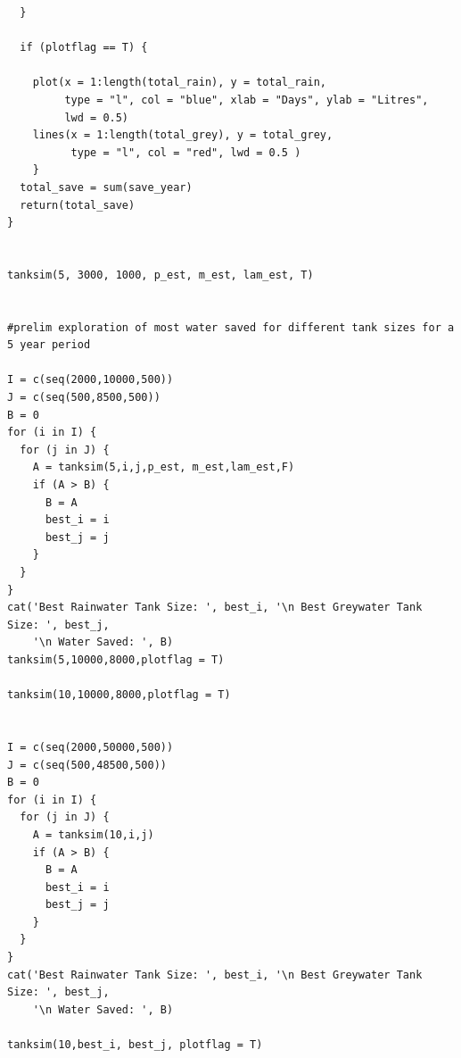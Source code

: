 \documentclass[a4paper, 11pt, oneside]{article}
\begin{document}
\begin{verbatim}
  }
  
  if (plotflag == T) {

    plot(x = 1:length(total_rain), y = total_rain,
         type = "l", col = "blue", xlab = "Days", ylab = "Litres",
         lwd = 0.5)
    lines(x = 1:length(total_grey), y = total_grey,
          type = "l", col = "red", lwd = 0.5 )
    }
  total_save = sum(save_year)
  return(total_save)
}


tanksim(5, 3000, 1000, p_est, m_est, lam_est, T)


#prelim exploration of most water saved for different tank sizes for a 5 year period

I = c(seq(2000,10000,500))
J = c(seq(500,8500,500))
B = 0
for (i in I) {
  for (j in J) {
    A = tanksim(5,i,j,p_est, m_est,lam_est,F)
    if (A > B) {
      B = A
      best_i = i
      best_j = j
    }
  }
}
cat('Best Rainwater Tank Size: ', best_i, '\n Best Greywater Tank Size: ', best_j,
    '\n Water Saved: ', B)
tanksim(5,10000,8000,plotflag = T)

tanksim(10,10000,8000,plotflag = T)


I = c(seq(2000,50000,500))
J = c(seq(500,48500,500))
B = 0
for (i in I) {
  for (j in J) {
    A = tanksim(10,i,j)
    if (A > B) {
      B = A
      best_i = i
      best_j = j
    }
  }
}
cat('Best Rainwater Tank Size: ', best_i, '\n Best Greywater Tank Size: ', best_j,
    '\n Water Saved: ', B)

tanksim(10,best_i, best_j, plotflag = T)

\end{verbatim}
\end{document}
